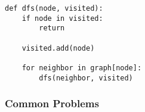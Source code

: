 \begin{algo}
\begin{lstlisting}
def dfs(node, visited):
    if node in visited:
        return

    visited.add(node)

    for neighbor in graph[node]:
        dfs(neighbor, visited)
\end{lstlisting}
\end{algo}

\newpage

\subsubsection{Common Problems}

\begin{summary}
\end{summary}